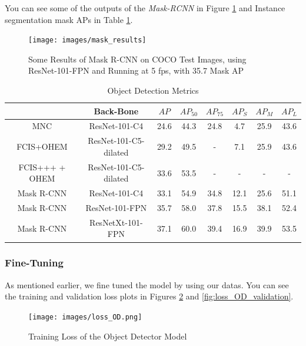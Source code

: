 \documentclass[a4paper, openany]{book}
\begin{document}
	
You can see some of the outputs of the \textit{Mask-RCNN} in Figure \ref{fig:mask_results} and Instance segmentation mask APs in Table \ref{table:APs}.
	
\begin{figure}[ht]
  \centering
    \texttt{[image: images/mask\_results]}
      \caption{Some Results of Mask R-CNN on COCO Test Images, using ResNet-101-FPN and Running at 5 fps, with 35.7 Mask AP }
  \label{fig:mask_results}
\end{figure}



\begin{table}[htp]
\caption{Object Detection Metrics}
\begin{center}
\begin{tabular}{c | c | c c c | c c c}
 & Back-Bone & $AP$ & $AP_{50}$ & $AP_{75}$ & $AP_S$ & $AP_M$ & $AP_L$\\
\hline
MNC & ResNet-101-C4 & 24.6 & 44.3 & 24.8 & 4.7 & 25.9 & 43.6\\
FCIS+OHEM& ResNet-101-C5-dilated & 29.2 & 49.5 & - & 7.1 & 25.9 & 43.6\\
FCIS+++ + OHEM& ResNet-101-C5-dilated & 33.6 & 53.5 & - & - & - & -\\
\hline
Mask R-CNN & ResNet-101-C4 & 33.1 & 54.9 & 34.8 & 12.1 & 25.6 & 51.1\\
Mask R-CNN & ResNet-101-FPN & 35.7 & 58.0 & 37.8 & 15.5 & 38.1 & 52.4\\
Mask R-CNN & ResNetXt-101-FPN & 37.1 & 60.0 & 39.4 & 16.9 & 39.9 & 53.5
\end{tabular}
\end{center}
\label{table:APs}
\end{table}%

\newpage
\subsubsection{Fine-Tuning}
	\vspace{0.3cm}

As mentioned earlier, we fine tuned the model by using our datas. You can see the training and validation loss plots in Figures \ref{fig:loss_OD} and \ref{fig:loss_OD_validation}.

\begin{figure}[ht]
  \centering
    \texttt{[image: images/loss\_OD.png]}
      \caption{Training Loss of the Object Detector Model}
  \label{fig:loss_OD}
\end{figure}
\end{document}
